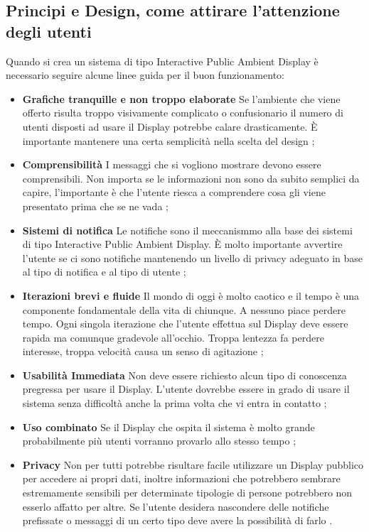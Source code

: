 \subsection{Principi e Design, come attirare l'attenzione degli utenti}
\noindent Quando si crea un sistema di tipo Interactive Public Ambient Display è necessario seguire alcune linee guida per il buon funzionamento:

\begin{itemize}
    \item \textbf{Grafiche tranquille e non troppo elaborate}\newline
 Se l'ambiente che viene offerto risulta troppo visivamente complicato o confusionario il numero di utenti disposti ad usare il Display potrebbe calare drasticamente. È importante mantenere una certa semplicità nella scelta del design \cite{interactive};
    \item \textbf{Comprensibilità}\newline
I messaggi che si vogliono mostrare devono essere comprensibili. Non importa se le informazioni non sono da subito semplici da capire, l'importante è che l'utente riesca a comprendere cosa gli viene presentato prima che se ne vada \cite{interactive};
    \item \textbf{Sistemi di notifica}\newline
 Le notifiche sono il meccanismmo alla base dei sistemi di tipo Interactive Public Ambient Display. È molto importante avvertire l'utente se ci sono notifiche mantenendo un livello di privacy adeguato in base al tipo di notifica e al tipo di utente \cite{interactive};
    \item \textbf{Iterazioni brevi e fluide}\newline
    Il mondo di oggi è molto caotico e il tempo è una componente fondamentale della vita di chiunque. A nessuno piace perdere tempo. Ogni singola iterazione che l'utente effettua sul Display deve essere rapida ma comunque gradevole all'occhio. Troppa lentezza fa perdere interesse, troppa velocità causa un senso di agitazione \cite{interactive};
    \item \textbf{Usabilità Immediata}\newline
    Non deve essere richiesto alcun tipo di conoscenza pregressa per usare il Display. L'utente dovrebbe essere in grado di usare il sistema senza difficoltà anche la prima volta che vi entra in contatto \cite{interactive};
    \item \textbf{Uso combinato}\newline
    Se il Display che ospita il sistema è molto grande probabilmente più utenti vorranno provarlo allo stesso tempo \cite{interactive};
    \item \textbf{Privacy}\newline
    Non per tutti potrebbe risultare facile utilizzare un Display pubblico per accedere ai propri dati, inoltre informazioni che potrebbero sembrare estremamente sensibili per determinate tipologie di persone potrebbero non esserlo affatto per altre. Se l'utente desidera nascondere delle notifiche prefissate o messaggi di un certo tipo deve avere la possibilità di farlo \cite{interactive}.
\end{itemize}


